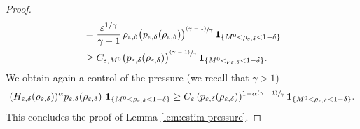 \documentclass[10pt]{amsart}
\newcommand{\<}{\bigl\langle}
\renewcommand{\>}{\bigr\rangle}
\newcommand{\psfrac}[2]{\sfrac{(#1)}{#2}}
\theoremstyle{definition}
\theoremstyle{remark}
\let\ep\varepsilon
\begin{document}
\begin{proof}
\begin{align*}
& = \dfrac{\ep^{1/\gamma}}{\gamma-1}\, \rho_{\ep,\delta} \big(p_{\ep,\delta}(\rho_{\ep,\delta})\big)^{\psfrac{\gamma-1}{\gamma}} \,\mathbf{1}_{\{M^0 < \rho_{\varepsilon,\delta} < 1-\delta\}} \\
& \geq C_{\ep,M^0} \big(p_{\ep,\delta}(\rho_{\ep,\delta})\big)^{\psfrac{\gamma-1}{\gamma}} \,\mathbf{1}_{\{M^0 < \rho_{\varepsilon,\delta} < 1-\delta\}}.
\end{align*}
We obtain again a control of the pressure (we recall that $\gamma > 1$)
\[
(H_{\varepsilon,\delta}(\rho_{\varepsilon, \delta}))^{\alpha}
p_{\varepsilon,\delta}(\rho_{\varepsilon,\delta})\,
\,\mathbf{1}_{\{M^0 <\rho_{\varepsilon,\delta} < 1-\delta\} }
\geq C_{\varepsilon}\, (p_{\varepsilon,\delta}(\rho_{\varepsilon,\delta}))^{1+\alpha\psfrac{\gamma-1}{\gamma}}
\,\mathbf{1}_{\{M^0 <\rho_{\varepsilon,\delta} < 1-\delta\} }.
\]
This concludes the proof of Lemma \ref{lem:estim-pressure}.
\end{proof}

\end{document}
